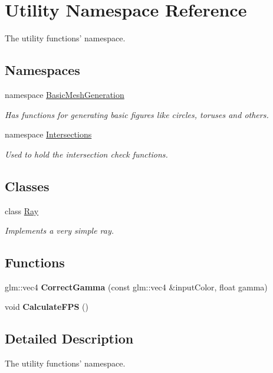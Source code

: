 \hypertarget{namespace_utility}{\section{Utility Namespace Reference}
\label{namespace_utility}
}


The utility functions' namespace.  


\subsection*{Namespaces}
\begin{DoxyCompactItemize}
\item 
namespace \hyperlink{namespace_utility_1_1_basic_mesh_generation}{Basic\-Mesh\-Generation}
\begin{DoxyCompactList}\small\item\em Has functions for generating basic figures like circles, toruses and others. \end{DoxyCompactList}\item 
namespace \hyperlink{namespace_utility_1_1_intersections}{Intersections}
\begin{DoxyCompactList}\small\item\em Used to hold the intersection check functions. \end{DoxyCompactList}\end{DoxyCompactItemize}
\subsection*{Classes}
\begin{DoxyCompactItemize}
\item 
class \hyperlink{class_utility_1_1_ray}{Ray}
\begin{DoxyCompactList}\small\item\em Implements a very simple ray. \end{DoxyCompactList}\end{DoxyCompactItemize}
\subsection*{Functions}
\begin{DoxyCompactItemize}
\item 
\hypertarget{namespace_utility_a3d50a44d144c24db38409f79c8b1b740}{glm\-::vec4 {\bfseries Correct\-Gamma} (const glm\-::vec4 \&input\-Color, float gamma)}\label{namespace_utility_a3d50a44d144c24db38409f79c8b1b740}

\item 
\hypertarget{namespace_utility_a1ddbf82c35e4c7585dfdb30294fbb8a1}{void {\bfseries Calculate\-F\-P\-S} ()}\label{namespace_utility_a1ddbf82c35e4c7585dfdb30294fbb8a1}

\end{DoxyCompactItemize}


\subsection{Detailed Description}
The utility functions' namespace. 